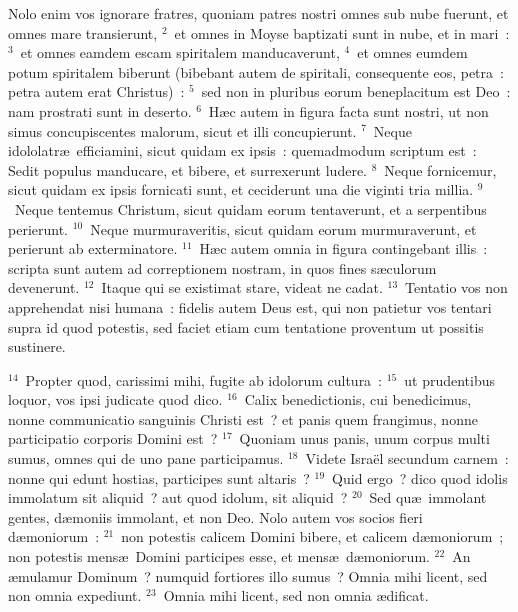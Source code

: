 \lettrine[lines=3,image=true,loversize=0.05,lraise=-0.03]{N}{}olo enim vos ignorare fratres, quoniam patres nostri omnes sub nube fuerunt, et omnes mare transierunt,
${}^{2}$~et omnes in Moyse baptizati sunt in nube, et in mari~:
${}^{3}$~et omnes eamdem escam spiritalem manducaverunt,
${}^{4}$~et omnes eumdem potum spiritalem biberunt (bibebant autem de spiritali, consequente eos, petra~: petra autem erat Christus)~:
${}^{5}$~sed non in pluribus eorum beneplacitum est Deo~: nam prostrati sunt in deserto.
${}^{6}$~H\ae c autem in figura facta sunt nostri, ut non simus concupiscentes malorum, sicut et illi concupierunt.
${}^{7}$~Neque idololatr\ae\ efficiamini, sicut quidam ex ipsis~: quemadmodum scriptum est~: Sedit populus manducare, et bibere, et surrexerunt ludere.
${}^{8}$~Neque fornicemur, sicut quidam ex ipsis fornicati sunt, et ceciderunt una die viginti tria millia.
${}^{9}$~Neque tentemus Christum, sicut quidam eorum tentaverunt, et a serpentibus perierunt.
${}^{10}$~Neque murmuraveritis, sicut quidam eorum murmuraverunt, et perierunt ab exterminatore.
${}^{11}$~H\ae c autem omnia in figura contingebant illis~: scripta sunt autem ad correptionem nostram, in quos fines s\ae culorum devenerunt.
${}^{12}$~Itaque qui se existimat stare, videat ne cadat.
${}^{13}$~Tentatio vos non apprehendat nisi humana~: fidelis autem Deus est, qui non patietur vos tentari supra id quod potestis, sed faciet etiam cum tentatione proventum ut possitis sustinere.


${}^{14}$~Propter quod, carissimi mihi, fugite ab idolorum cultura~:
${}^{15}$~ut prudentibus loquor, vos ipsi judicate quod dico.
${}^{16}$~Calix benedictionis, cui benedicimus, nonne communicatio sanguinis Christi est~? et panis quem frangimus, nonne participatio corporis Domini est~?
${}^{17}$~Quoniam unus panis, unum corpus multi sumus, omnes qui de uno pane participamus.
${}^{18}$~Videte Isra\"el secundum carnem~: nonne qui edunt hostias, participes sunt altaris~?
${}^{19}$~Quid ergo~? dico quod idolis immolatum sit aliquid~? aut quod idolum, sit aliquid~?
${}^{20}$~Sed qu\ae\ immolant gentes, d\ae moniis immolant, et non Deo. Nolo autem vos socios fieri d\ae moniorum~:
${}^{21}$~non potestis calicem Domini bibere, et calicem d\ae moniorum~; non potestis mens\ae\ Domini participes esse, et mens\ae\ d\ae moniorum.
${}^{22}$~An \ae mulamur Dominum~? numquid fortiores illo sumus~? Omnia mihi licent, sed non omnia expediunt.
${}^{23}$~Omnia mihi licent, sed non omnia \ae dificat.


